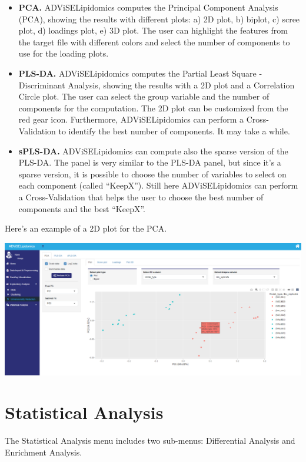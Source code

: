 \documentclass[
]{book}
\providecommand{\tightlist}{%
  \setlength{\itemsep}{0pt}\setlength{\parskip}{0pt}}
\begin{document}
\begin{itemize}
\tightlist
\item
  \textbf{PCA.} ADViSELipidomics computes the Principal Component Analysis (PCA), showing the results with different plots: a) 2D plot, b) biplot, c) scree plot, d) loadings plot, e) 3D plot. The user can highlight the features from the target file with different colors and select the number of components to use for the loading plots.
\item
  \textbf{PLS-DA.} ADViSELipidomics computes the Partial Least Square - Discriminant Analysis, showing the results with a 2D plot and a Correlation Circle plot. The user can select the group variable and the number of components for the computation. The 2D plot can be customized from the red gear icon. Furthermore, ADViSELipidomics can perform a Cross-Validation to identify the best number of components. It may take a while.
\item
  \textbf{sPLS-DA.} ADViSELipidomics can compute also the sparse version of the PLS-DA. The panel is very similar to the PLS-DA panel, but since it's a sparse version, it is possible to choose the number of variables to select on each component (called ``KeepX''). Still here ADViSELipidomics can perform a Cross-Validation that helps the user to choose the best number of components and the best ``KeepX''.
\end{itemize}

Here's an example of a 2D plot for the PCA.

\includegraphics[width=1\linewidth]{images/pca}

\hypertarget{sec35}{%
\section{Statistical Analysis}\label{sec35}}

The Statistical Analysis menu includes two sub-menus: Differential Analysis and Enrichment Analysis.
\end{document}
